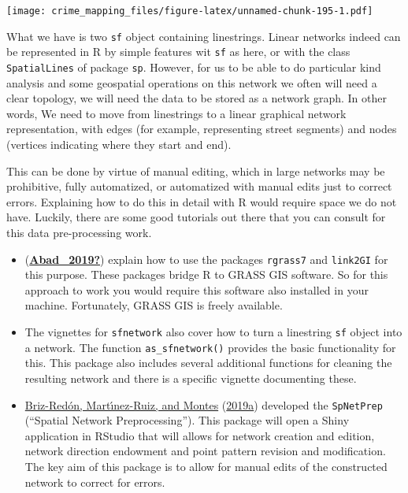 \documentclass[
  krantz2]{krantz}
\providecommand{\tightlist}{%
  \setlength{\itemsep}{0pt}\setlength{\parskip}{0pt}}
\begin{document}
\texttt{[image: crime\_mapping\_files/figure-latex/unnamed-chunk-195-1.pdf]}

What we have is two \texttt{sf} object containing linestrings. Linear networks indeed can be represented in R by simple features wit \texttt{sf} as here, or with the class \texttt{SpatialLines} of package \texttt{sp}. However, for us to be able to do particular kind analysis and some geospatial operations on this network we often will need a clear topology, we will need the data to be stored as a network graph. In other words, We need to move from linestrings to a linear graphical network representation, with edges (for example, representing street segments) and nodes (vertices indicating where they start and end).

This can be done by virtue of manual editing, which in large networks may be prohibitive, fully automatized, or automatized with manual edits just to correct errors. Explaining how to do this in detail with R would require space we do not have. Luckily, there are some good tutorials out there that you can consult for this data pre-processing work.

\begin{itemize}
\tightlist
\item
  (\protect\hyperlink{ref-Abad_2019}{\textbf{Abad\_2019?}}) explain how to use the packages \texttt{rgrass7} and \texttt{link2GI} for this purpose. These packages bridge R to GRASS GIS software. So for this approach to work you would require this software also installed in your machine. Fortunately, GRASS GIS is freely available.
\item
  The vignettes for \texttt{sfnetwork} also cover how to turn a linestring \texttt{sf} object into a network. The function \texttt{as\_sfnetwork()} provides the basic functionality for this. This package also includes several additional functions for cleaning the resulting network and there is a specific vignette documenting these.
\item
  \protect\hyperlink{ref-BrizRedon_2019a}{Briz-Redón, Martı́nez-Ruiz, and Montes} (\protect\hyperlink{ref-BrizRedon_2019a}{2019a}) developed the \texttt{SpNetPrep} (``Spatial Network Preprocessing''). This package will open a Shiny application in RStudio that will allows for network creation and edition, network direction endowment and point pattern revision and modiﬁcation. The key aim of this package is to allow for manual edits of the constructed network to correct for errors.
\end{itemize}
\end{document}
